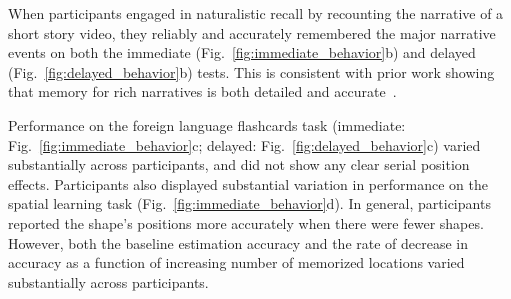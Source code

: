 \documentclass[10pt]{article}
\begin{document}
When participants engaged in naturalistic recall by recounting the
narrative of a short story video, they reliably and accurately
remembered the major narrative events on both the immediate
(Fig.~\ref{fig:immediate_behavior}b) and delayed
(Fig.~\ref{fig:delayed_behavior}b) tests.  This is consistent with
prior work showing that memory for rich narratives is both detailed
and accurate~\citep{HeusEtal21, ChenEtal17}.

Performance on the foreign language flashcards task (immediate:
Fig.~\ref{fig:immediate_behavior}c; delayed:
Fig.~\ref{fig:delayed_behavior}c) varied substantially across
participants, and did not show any clear serial position effects.
Participants also displayed substantial variation in performance on
the spatial learning task (Fig.~\ref{fig:immediate_behavior}d).  In
general, participants reported the shape's positions more accurately
when there were fewer shapes.  However, both the baseline estimation accuracy and
the rate of decrease in accuracy as a function of increasing number of
memorized locations varied substantially across participants.
\end{document}
